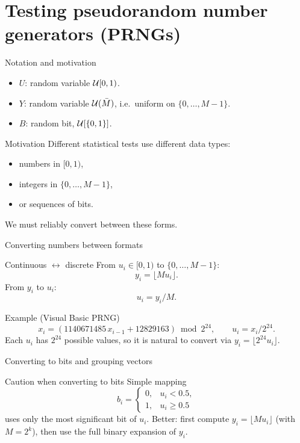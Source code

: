 \documentclass[aspectratio=169]{beamer}
\begin{document}
\section{Testing pseudorandom number generators (PRNGs)}


\begin{frame}{Notation and motivation}
\begin{itemize}
  \item $U$: random variable ${\cal U}[0,1)$.
  \item $Y$: random variable ${\cal U}(\bar{M})$, i.e.\ uniform on $\{0,\ldots,M-1\}$.
  \item $B$: random bit, ${\cal U}[\{0,1\}]$.
\end{itemize}

\begin{block}{Motivation}
Different statistical tests use different data types:
\begin{itemize}
  \item numbers in $[0,1)$,
  \item integers in $\{0,\ldots,M-1\}$,
  \item or sequences of bits.
\end{itemize}
We must reliably convert between these forms.
\end{block}
\end{frame}

\begin{frame}{Converting numbers between formats}
\begin{block}{Continuous $\leftrightarrow$ discrete}
From $u_i\in[0,1)$ to $\{0,\ldots,M-1\}$:
\[
y_i = \lfloor M u_i \rfloor .
\]
From $y_i$ to $u_i$:
\[
u_i = y_i / M .
\]
\end{block}

\begin{block}{Example (Visual Basic PRNG)}
\[
x_i = (1140671485\,x_{i-1} + 12829163) \bmod 2^{24}, \qquad
u_i = x_i / 2^{24}.
\]
Each $u_i$ has $2^{24}$ possible values,
so it is natural to convert via $y_i=\lfloor2^{24}u_i\rfloor$.
\end{block}
\end{frame}

\begin{frame}{Converting to bits and grouping vectors}
\begin{block}{Caution when converting to bits}
Simple mapping
\[
b_i =
\begin{cases}
0,&u_i<0.5,\\
1,&u_i\ge 0.5
\end{cases}
\]
uses only the most significant bit of $u_i$.
Better: first compute $y_i=\lfloor M u_i\rfloor$ (with $M=2^k$),
then use the full binary expansion of $y_i$.
\end{block}


\end{frame}
\end{document}
